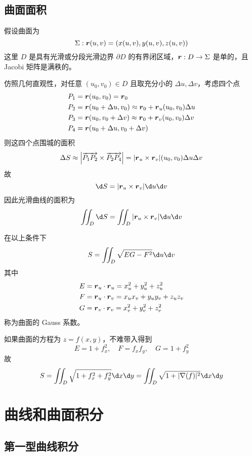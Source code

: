 \subsection{曲面面积}

假设曲面为
\[ \Sigma : \boldsymbol{r}(u, v) = (x(u, v), y(u, v), z(u, v)) \]
这里 $D$ 是具有光滑或分段光滑边界 $\partial D$ 的有界闭区域，$\boldsymbol{r} : D \to \Sigma$ 是单的，且 Jacobi 矩阵是满秩的。

仿照几何直观性，对任意 $(u_0, v_0) \in D$ 且取充分小的 $\Delta u, \Delta v$，考虑四个点
\[ \begin{aligned}
		P_1 & = \boldsymbol{r}(u_0, v_0) = \boldsymbol{r}_0                                                  \\
		P_2 & = \boldsymbol{r}(u_0 + \Delta u, v_0) \approx  \boldsymbol{r}_0 + \boldsymbol{r}_u(u_0, v_0) \Delta u \\
		P_3 & = \boldsymbol{r}(u_0, v_0 + \Delta v) \approx \boldsymbol{r}_0 + \boldsymbol{r}_v(u_0, v_0) \Delta v  \\
		P_4 & = \boldsymbol{r}(u_0 + \Delta u, v_0 + \Delta v)                                        \\
	\end{aligned} \]
则这四个点围城的面积
\[ \Delta S \approx \left| \overrightarrow{P_1P_2} \times \overrightarrow{P_2 P_4} \right| = |\boldsymbol{r}_u \times \boldsymbol{r}_v| (u_0, v_0) \Delta u \Delta v \]
故
\[ \d S = |\vbf{r}_u \times \vbf{r}_v| \d u \d v \]
因此光滑曲线的面积为
\[ \iint_D \d S = \iint_D |\vbf{r}_u \times \vbf{r}_v| \d u \d v \]

在以上条件下
\[ S = \iint_D \sqrt{EG - F^2} \d u \d v \]
其中
\[ \begin{aligned}
		E & = \boldsymbol{r}_u \cdot \boldsymbol{r}_u = x_u^2 + y_u^2 + z_u^2       \\
		F & = \boldsymbol{r}_u \cdot \boldsymbol{r}_v = x_u x_v + y_u y_v + z_u z_v \\
		G & = \boldsymbol{r}_v \cdot \boldsymbol{r}_v = x_v^2 + y_v^2 + z_v^2
	\end{aligned} \]
称为曲面的 Gauss 系数。

如果曲面的方程为 $z = f(x, y)$，不难带入得到
\[ E = 1 + f_x^2, \quad F = f_x f_y, \quad G = 1 + f_y^2 \]
故
\[ S = \iint_D \sqrt{1 + f_x^2 + f_y^2} \d x \d y = \iint_D \sqrt{1 + |\nabla(f)|^2} \d x \d y \]

\section{曲线和曲面积分}

\subsection{第一型曲线积分}


